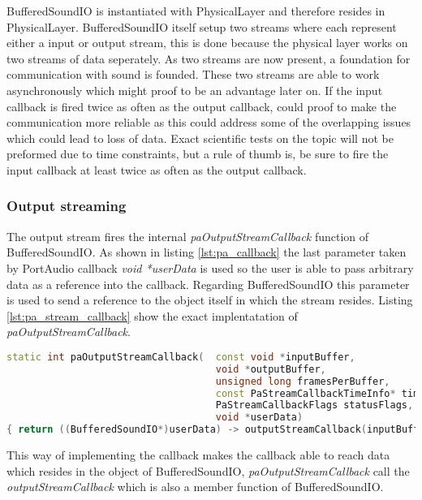 	BufferedSoundIO is instantiated with PhysicalLayer and therefore resides in PhysicalLayer. BufferedSoundIO itself setup two streams where each
	represent either a input or output stream, this is done because the physical layer works on two streams of data seperately. As two streams are 
	now present, a foundation for communication with sound is founded. These two streams are able to work asynchronously which might proof to be an
	advantage later on. If the input callback is fired twice as often as the output callback, could proof to make the communication more reliable
	as this could address some of the overlapping issues which could lead to loss of data. Exact scientific tests on the topic will not be preformed
	due to time constraints, but a rule of thumb is, be sure to fire the input callback at least twice as often as the output callback.
	
		\subsubsection{Output streaming}
		The output stream fires the internal \textit{paOutputStreamCallback} function of BufferedSoundIO. As shown in listing \ref{lst:pa_callback}
		the last parameter taken by PortAudio callback \textit{void *userData} is used so the user is able to pass arbitrary data as a reference into the
		callback. Regarding BufferedSoundIO this parameter is used to send a reference to the object itself in which the stream resides. 
		Listing \ref{lst:pa_stream_callback} show the exact implentatation of \textit{paOutputStreamCallback}.
		
		\begin{lstlisting}[float=htb,language={C++},caption={Implementation of \textit{paOutputStreamCallback}.}]
static int paOutputStreamCallback(	const void *inputBuffer,
									void *outputBuffer,
									unsigned long framesPerBuffer,
									const PaStreamCallbackTimeInfo* timeInfo,
									PaStreamCallbackFlags statusFlags,
									void *userData)
{ return ((BufferedSoundIO*)userData) -> outputStreamCallback(inputBuffer, outputBuffer, framesPerBuffer, timeInfo, statusFlags); }
		\end{lstlisting}\label{lst:pa_stream_callback}
		
		This way of implementing the callback makes the callback able to reach data which resides in the object of BufferedSoundIO,
		\textit{paOutputStreamCallback} call the \textit{outputStreamCallback} which is also a member function of BufferedSoundIO.
		
